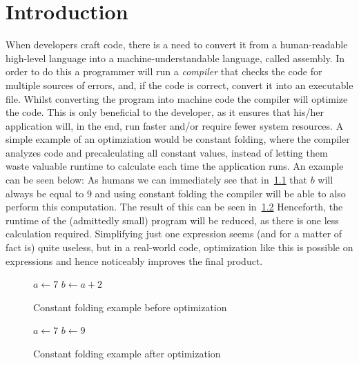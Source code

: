 \chapter{Introduction}\label{sec:intro}



When developers craft code, there is a need to convert it from a human-readable high-level language into a machine-understandable language, called assembly.
In order to do this a programmer will run a \textit{compiler} that checks the code for multiple sources of errors, and, if the code is correct, convert it into an executable file.
Whilst converting the program into machine code the compiler will optimize the code.
This is only beneficial to the developer, as it ensures that his/her application will, in the end, run faster and/or require fewer system resources.
A simple example of an optimziation would be constant folding, where the compiler analyzes code and precalculating all constant values, instead of letting them waste valuable runtime to calculate each time the application runs.
An example can be seen below:
As humans we can immediately see that in~\cref{fig:intro:cf1} that $b$ will always be equal to $9$ and using constant folding the compiler will be able to also perform this computation.
The result of this can be seen in~\cref{fig:intro:cf2}
Henceforth, the runtime of the (admittedly small) program will be reduced, as there is one less calculation required.
Simplifying just one expression seems (and for a matter of fact is) quite useless, but in a real-world code, optimization like this is possible on expressions and hence noticeably improves the final product.
\begin{figure}[h]
    \begin{algorithmic}
        \State $a \gets 7$
        \State $b \gets a + 2$
    \end{algorithmic}
    \caption{Constant folding example before optimization}
    \label{fig:intro:cf1}
\end{figure}
\begin{figure}[h]
    \begin{algorithmic}
        \State $a \gets 7$
        \State $b \gets 9$
    \end{algorithmic}
    \caption{Constant folding example after optimization}
    \label{fig:intro:cf2}
\end{figure}


